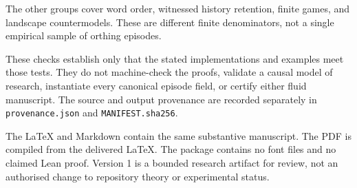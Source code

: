 \documentclass[11pt,a4paper]{article}
\begin{document}
The other groups cover word order, witnessed history retention, finite
games, and landscape countermodels. These are different finite
denominators, not a single empirical sample of orthing episodes.

These checks establish only that the stated implementations and examples
meet those tests. They do not machine-check the proofs, validate a
causal model of research, instantiate every canonical episode field, or
certify either fluid manuscript. The source and output provenance are
recorded separately in \texttt{provenance.json} and
\texttt{MANIFEST.sha256}.

The LaTeX and Markdown contain the same substantive manuscript. The PDF
is compiled from the delivered LaTeX. The package contains no font files
and no claimed Lean proof. Version 1 is a bounded research artifact for
review, not an authorised change to repository theory or experimental
status.
\end{document}
